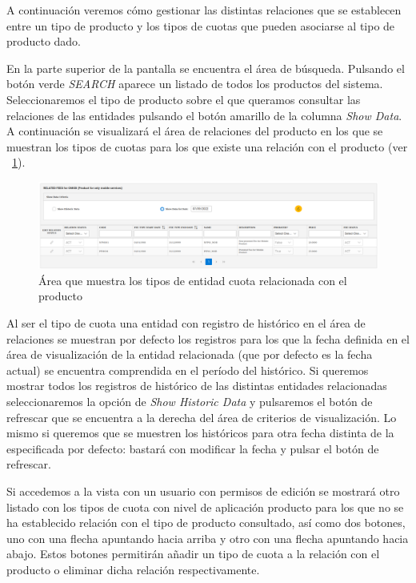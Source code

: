 A continuación veremos cómo gestionar las distintas relaciones que se establecen entre un tipo de producto y los tipos de cuotas que pueden asociarse al tipo de producto dado.


En la parte superior de la pantalla se encuentra el área de búsqueda. Pulsando el botón verde \emph{SEARCH} aparece un listado de todos los productos del sistema. Seleccionaremos el tipo de producto sobre el que queramos consultar las relaciones de las entidades pulsando el botón amarillo de la columna \emph{Show Data}. A continuación se visualizará el área de relaciones del producto en los que se muestran los tipos de cuotas para los que existe una relación con el producto (ver \figurename~\ref{fig:area-relacion-tipos-entidades}).


\begin{figure}[H]
  \centering
  \includegraphics[width=\textwidth]{imaxes/area-relacion-tipos-entidades.png}
  \caption{Área que muestra los tipos de entidad cuota relacionada con el producto}
  \label{fig:area-relacion-tipos-entidades}
\end{figure}



Al ser el tipo de cuota una entidad con registro de histórico en el área de relaciones se muestran por defecto los registros para los que la fecha definida en el área de visualización de la entidad relacionada (que por defecto es la fecha actual) se encuentra comprendida en el período del histórico. Si queremos mostrar todos los registros de histórico de las distintas entidades relacionadas seleccionaremos la opción de \emph{Show Historic Data} y pulsaremos el botón de refrescar que se encuentra a la derecha del área de criterios de visualización. Lo mismo si queremos que se muestren los históricos para otra fecha distinta de la especificada por defecto: bastará con modificar la fecha y pulsar el botón de refrescar.

Si accedemos a la vista con un usuario con permisos de edición se mostrará otro listado con los tipos de cuota con nivel de aplicación producto para los que no se ha establecido relación con el tipo de producto consultado, así como dos botones, uno con una flecha apuntando hacia arriba y otro con una flecha apuntando hacia abajo. Estos botones permitirán añadir un tipo de cuota a la relación con el producto o eliminar dicha relación respectivamente. 



